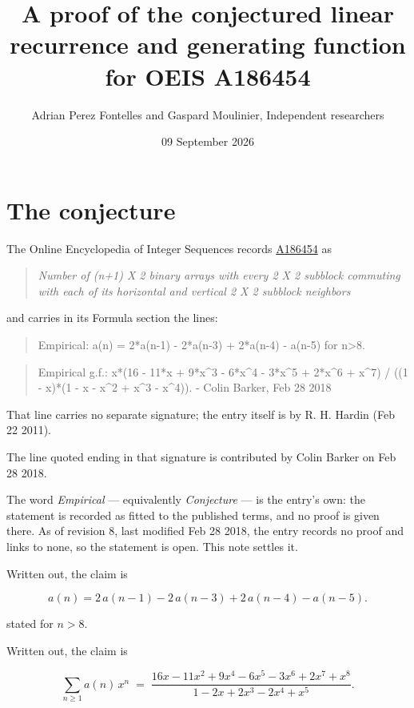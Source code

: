 \documentclass[11pt]{article}
\title{A proof of the conjectured linear recurrence and generating function for OEIS A186454}
\author{Adrian Perez Fontelles and Gaspard Moulinier, Independent researchers}
\date{09 September 2026}
\theoremstyle{definition}
\begin{document}
\maketitle
\section{The conjecture}

The Online Encyclopedia of Integer Sequences records \href{https://oeis.org/A186454}{A186454} as

\begin{quote}\itshape Number of (n+1) X 2 binary arrays with every 2 X 2 subblock commuting with each of its horizontal and vertical 2 X 2 subblock neighbors\end{quote}

and carries in its Formula section the lines:

\begin{quote}\ttfamily Empirical: a(n) = 2*a(n-1) - 2*a(n-3) + 2*a(n-4) - a(n-5) for n>8.\end{quote}

\begin{quote}\ttfamily Empirical g.f.: x*(16 - 11*x + 9*x\textasciicircum{}3 - 6*x\textasciicircum{}4 - 3*x\textasciicircum{}5 + 2*x\textasciicircum{}6 + x\textasciicircum{}7) / ((1 - x)*(1 - x - x\textasciicircum{}2 + x\textasciicircum{}3 - x\textasciicircum{}4)). - Colin Barker, Feb 28 2018\end{quote}

That line carries no separate signature; the entry itself is by R. H. Hardin (Feb 22 2011).

The line quoted ending in that signature is contributed by Colin Barker on Feb 28 2018.

The word {\itshape Empirical} --- equivalently {\itshape Conjecture} --- is the entry's own: the statement is recorded as fitted to the published terms, and no proof is given there. As of revision 8, last modified Feb 28 2018, the entry records no proof and links to none, so the statement is open. This note settles it.

Written out, the claim is

\[a(n) = 2\,a(n-1) - 2\,a(n-3) + 2\,a(n-4) - a(n-5).\]

stated for $n > 8$.

Written out, the claim is

\[\sum_{n \ge 1} a(n)\,x^n \;=\; \frac{16x - 11x^{2} + 9x^{4} - 6x^{5} - 3x^{6} + 2x^{7} + x^{8}}{1 - 2x + 2x^{3} - 2x^{4} + x^{5}}.\]
\end{document}
